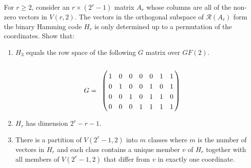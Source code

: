\prob
{
    For $r \geq 2$, consider an $r\times (2^r -1)$ matrix $A_r$ whose columns are all of the non-zero vectors in
    $V(r,2)$. The vectors in the orthogonal subspace of $\mathcal{R}(A_r)$ form the binary Hamming code $H_r$ is only
    determined up to a permutation of the coordinates. Show that:
    \begin{enumerate}[label=(\roman*)]
        \item $H_3$ equals the row space of the following $G$ matrix over $GF(2)$.
                \begin{align}
                G =
                    \bordermatrix{
                            &       &       &       &       &       &       &       \cr
                            &   1   &   0   &   0   &   0   &   0   &   1   &   1   \cr
                            &   0   &   1   &   0   &   0   &   1   &   0   &   1   \cr
                            &   0   &   0   &   1   &   0   &   1   &   1   &   0   \cr
                            &   0   &   0   &   0   &   1   &   1   &   1   &   1   \cr
                    }  
                \end{align}\pn
        \item $H_r$ has dimension $2^r -r - 1$.
        \item There is a partition of $V(2^r - 1, 2)$ into $m$ classes where $m$ is the number of vectors in $H_r$ and
              each class contains a unique member $v$ of $H_r$ together with all members of $V(2^r - 1, 2)$ that differ from $v$ in
              exactly one coordinate.
    \end{enumerate}
}
